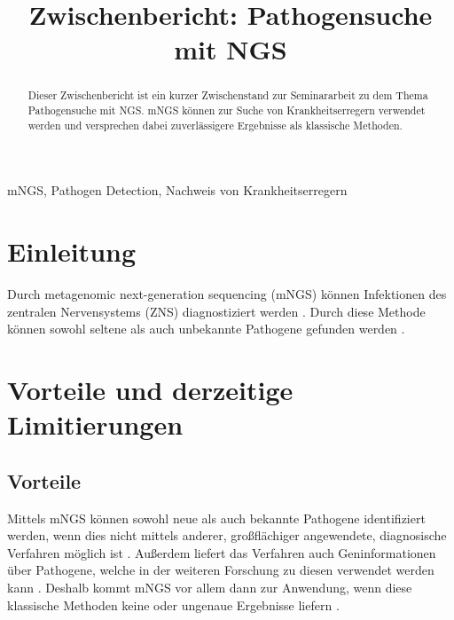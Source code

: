 \documentclass[a4paper, conference]{IEEEtran}
\newcommand{\quotationMarkGerman}[1]{\glqq{}#1\grqq{}}
\newcommand{\topic}{Zwischenbericht: Pathogensuche mit NGS}
\newcommand{\authorA}{Björn Emanuel Fürtges}
\newcommand{\indexTerms}{mNGS, Pathogen Detection, Nachweis von Krankheitserregern}
\begin{document}
\title{\topic
}

\author{\IEEEauthorblockN{\authorA}
}

\maketitle

\begin{abstract}
Dieser Zwischenbericht ist ein kurzer Zwischenstand zur Seminararbeit zu dem Thema \quotationMarkGerman{Pathogensuche mit NGS}. mNGS können zur Suche von Krankheitserregern verwendet werden und versprechen dabei zuverlässigere Ergebnisse als \quotationMarkGerman{klassische} Methoden.
\end{abstract}

\begin{IEEEkeywords}
\indexTerms
\end{IEEEkeywords}

\section{Einleitung}
Durch metagenomic next-generation sequencing (mNGS) können Infektionen des zentralen Nervensystems (ZNS) diagnostiziert werden \cite{clinicalMetagenomicNextGenerationSequencing}. Durch diese Methode können sowohl seltene als auch unbekannte Pathogene gefunden werden \cite{clinicalMetagenomicNextGenerationSequencing}.

\section{Vorteile und derzeitige Limitierungen}
\subsection{Vorteile}
Mittels mNGS können sowohl neue als auch bekannte Pathogene identifiziert werden, wenn dies nicht mittels anderer, großflächiger angewendete, diagnosische Verfahren möglich ist \cite{clinicalMetagenomicNextGenerationSequencing}. Außerdem liefert das Verfahren auch Geninformationen über Pathogene, welche in der weiteren Forschung zu diesen verwendet werden kann \cite{clinicalMetagenomicNextGenerationSequencing}. Deshalb kommt mNGS vor allem dann zur Anwendung, wenn diese \quotationMarkGerman{klassische} Methoden keine oder ungenaue Ergebnisse liefern \cite{weiGuSteveMillerCharlesChiuMNGSPathogenDetection}.
\end{document}
